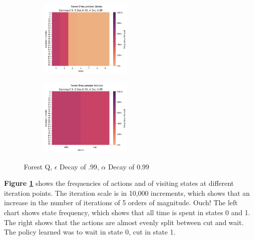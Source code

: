 \documentclass[letterpaper]{article} %
\begin{document}
\begin{figure}[!htb]
	\begin{subfigure}[b]{0.25\textwidth}
		\centering
		\includegraphics[width=1.75in]{Figures/Forest_Frequencies_States_Gamma_0_9__E_Dec_0_99__A_Dec_0_99.png}
  	\end{subfigure}%
	\begin{subfigure}[b]{0.25\textwidth}
		\centering
		\includegraphics[width=1.75in]{Figures/Forest_Frequencies_Actions_Gamma_0_9__E_Dec_0_99__A_Dec_0_99.png}
  	\end{subfigure}%
\caption{Forest Q,  $\epsilon$ Decay of .99, $\alpha$ Decay of 0.99}
\label{fig:forest_q_e_99_a_99_frequencies}
\end{figure}

\textbf{Figure \ref{fig:forest_q_e_99_a_99_frequencies}} shows the frequencies of actions and of visiting states at different iteration points.  The iteration scale is in 10,000 increments, which shows that an increase in the number of iterations of 5 orders of magnitude. Ouch!  The left chart shows state frequency, which shows that all time is spent in states 0 and 1.  The right shows that the actions are almost evenly split between cut and wait.  The policy learned was to wait in state 0, cut in state 1.
\end{document}
